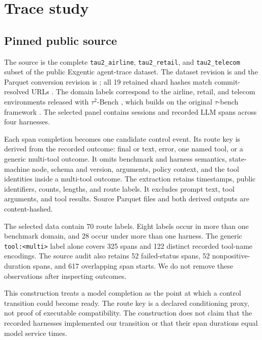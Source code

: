 \section{Trace study}
\label{sec:trace-method}

\subsection{Pinned public source}

The source is the complete \texttt{tau2\_airline}, \texttt{tau2\_retail}, and
\texttt{tau2\_telecom} subset of the public Exgentic agent-trace dataset. The
dataset revision is
and the Parquet conversion revision is
; all 19 retained shard hashes
match commit-resolved URLs \cite{exgentic2026traces}. The domain labels correspond to the airline, retail,
and telecom environments released with $\tau^2$-Bench
\cite{barres2026tau2bench}, which builds on the original $\tau$-bench framework
\cite{yao2024taubench}. The selected panel contains
\TraceSessions{} sessions and \TraceSpans{} recorded LLM spans across four
harnesses.

Each span completion becomes one candidate control event. Its route key is
derived from the recorded outcome: final or text, error, one named tool, or a
generic multi-tool outcome. It omits benchmark and harness semantics,
state-machine node, schema and version, arguments, policy context, and the tool
identities inside a multi-tool outcome. The extraction retains timestamps,
public identifiers, counts, lengths, and route labels. It excludes prompt text,
tool arguments, and tool results. Source Parquet files and both derived outputs
are content-hashed.

The selected data contain 70 route labels. Eight labels occur in more than one
benchmark domain, and 28 occur under more than one harness. The generic
\texttt{tool:<multi>} label alone covers 325 spans and 122 distinct recorded
tool-name encodings. The source audit also retains 52 failed-status spans, 52
nonpositive-duration spans, and 617 overlapping span starts. We do not remove
these observations after inspecting outcomes.

This construction treats a model completion as the point at which a control
transition could become ready. The route key is a declared conditioning proxy,
not proof of executable compatibility. The construction does not claim that
the recorded harnesses implemented our transition or that their span durations
equal model service times.

